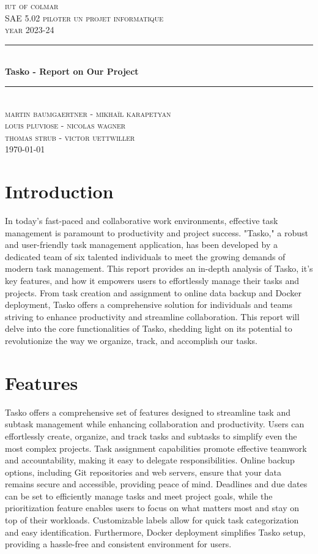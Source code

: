 \documentclass[12pt, a4paper]{article}
\begin{document}
\begin{titlepage}
	\newcommand{\HRule}{\rule{\linewidth}{0.5mm}} 
	\center 
	\textsc{\LARGE iut of colmar}\\[6.5cm] 
	\textsc{\Large SAE 5.02 piloter un projet informatique}\\[0.5cm] 
	\textsc{\large year 2023-24}\\[0.5cm]
	\HRule\\[0.75cm]
	{\Large\bfseries Tasko - Report on Our Project}\\[0.4cm]
	\HRule\\[0.5cm]
	\textsc{\large martin baumgaertner - mikhaïl karapetyan\\louis pluviose - nicolas wagner\\thomas strub - victor uettwiller}\\[6cm] 

	\vfill\vfill\vfill
	{\large\today} 
	\vfill
\end{titlepage}
\newpage
\tableofcontents
\listoffigures
\newpage
\section{Introduction}
In today's fast-paced and collaborative work 
environments, effective task management is paramount 
to productivity and project success. "Tasko," a 
robust and user-friendly task management application, 
has been developed by a dedicated team of six talented 
individuals to meet the growing demands of modern task 
management. This report provides an in-depth analysis 
of Tasko, it's key features, and how it empowers users 
to effortlessly manage their tasks and projects. From 
task creation and assignment to online data backup and 
Docker deployment, Tasko offers a comprehensive 
solution for individuals and teams striving to enhance 
productivity and streamline collaboration. This 
report will delve into the core functionalities of 
Tasko, shedding light on its potential to revolutionize 
the way we organize, track, and accomplish our tasks.

\section{Features}
Tasko offers a comprehensive set of features designed 
to streamline task and subtask management while 
enhancing collaboration and productivity. Users 
can effortlessly create, organize, and track 
tasks and subtasks to simplify even the most 
complex projects. Task assignment capabilities 
promote effective teamwork and accountability, 
making it easy to delegate responsibilities. 
Online backup options, including Git repositories 
and web servers, ensure that your data remains 
secure and accessible, providing peace of mind. 
Deadlines and due dates can be set to efficiently 
manage tasks and meet project goals, while the 
prioritization feature enables users to focus on 
what matters most and stay on top of their workloads. 
Customizable labels allow for quick task categorization 
and easy identification. Furthermore, Docker deployment 
simplifies Tasko setup, providing a hassle-free and 
consistent environment for users.
\end{document}
